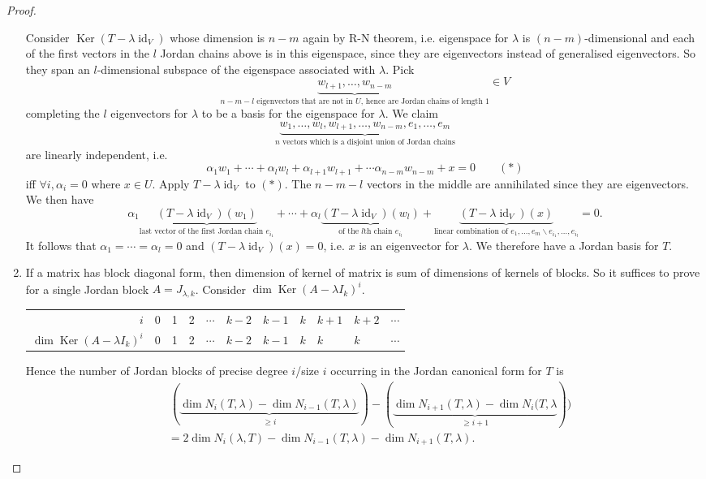 \documentclass[a4paper]{article}
\newcommand{\Ker}{\operatorname{Ker}}
\newcommand{\id}{\operatorname{id}}
\theoremstyle{definition}
\begin{document}
\begin{proof}
\begin{enumerate}
    Consider $\Ker (T-\lambda \id_V)$ whose dimension is $n-m$ again by R-N theorem, i.e. eigenspace for $\lambda$ is $(n-m)$-dimensional and each of the first vectors in the $l$ Jordan chains above is in this eigenspace, since they are eigenvectors instead of generalised eigenvectors. So they span an $l$-dimensional subspace of the eigenspace associated with $\lambda$. Pick
\[
\underbrace{w_{l+1},\ldots,w_{n-m}}_{n-m-l\text{ eigenvectors that are not in }U\text{, hence are Jordan chains of length 1}} \in V
\]
completing the $l$ eigenvectors for $\lambda$ to be a basis for the eigenspace for $\lambda$. We claim
\[
\underbrace{w_1,\ldots,w_l,w_{l+1},\ldots,w_{n-m},e_1,\ldots,e_m}_{n\text{ vectors which is a disjoint union of Jordan chains}}
\]
are linearly independent, i.e.
\[
\alpha_1 w_1+\cdots+\alpha_l w_l+\alpha_{l+1} w_{l+1}+\cdots \alpha_{n-m} w_{n-m}+x=0\qquad (\ast)
\]
iff $\forall i, \alpha_i=0$ where $x\in U$. Apply $T-\lambda \id _V$ to $(\ast)$. The $n-m-l$ vectors in the middle are annihilated since they are eigenvectors. We then have
\[
\alpha_1 \underbrace{(T-\lambda \id_V)(w_1)}_{\text{last vector of the first Jordan chain } e_{i_1}}+\cdots+\alpha_l \underbrace{(T-\lambda \id_V)(w_l)}_{\text{of the }l\text{th chain } e_{i_l}}+\underbrace{(T-\lambda \id_V)(x)}_{\text{linear combination of }e_1,\ldots,e_m \backslash e_{i_1},\ldots,e_{i_l}}=0 .
\]
It follows that $\alpha_1=\cdots=\alpha_l=0$ and $(T-\lambda \id_V)(x)=0$, i.e. $x$ is an eigenvector for $\lambda$. We therefore have a Jordan basis for $T$.
    \item If a matrix has block diagonal form, then dimension of kernel of matrix is sum of dimensions of kernels of blocks. So it suffices to prove for a single Jordan block $A = J_{\lambda,k}$. Consider $\dim \Ker (A-\lambda I_k)^i$.
    \begin{table}[H]
\centering
    \begin{tabular}{r|llllllllll}
        $i$ & 0 & 1 & 2 & $\cdots$ & $k-2$ & $k-1$ & $k$ & $k+1$ & $k+2$ & $\cdots$ \\
        $\dim \Ker (A-\lambda I_k)^i$  & 0 & 1 & 2 & $\cdots$ & $k-2$ & $k-1$ & $k$ & $k$   & $k$   & $\cdots$
    \end{tabular}
    \end{table}
    
    Hence the number of Jordan blocks of precise degree $i$/size $i$ occurring in the Jordan canonical form for $T$ is
\[
\begin{aligned}
        &\, (\underbrace{\dim N_i(T,\lambda)-\dim N_{i-1}(T,\lambda)}_{\geq i})-(\underbrace{\dim N_{i+1}(T,\lambda)-\dim N_{i}(T,\lambda}_{\geq i+1}))\\&=2\dim N_i(\lambda,T)-\dim N_{i-1}(T,\lambda)-\dim N_{i+1}(T,\lambda).
    \end{aligned}
\]
    

\end{enumerate}
\end{proof}
\end{document}

